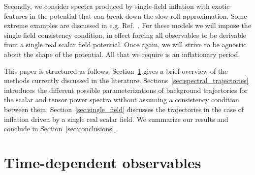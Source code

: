 \documentclass[a4paper,11pt]{article}
\begin{document}
Secondly, we consider spectra produced by single-field inflation with
exotic features in the potential that can break down the slow roll
approximation. Some extreme examples are discussed in
e.g. Ref.~\cite{Starobinsky1998}. For these models we will impose the
single field consistency condition, in effect forcing all observables
to be derivable from a single real scalar field potential. Once again,
we will strive to be agnostic about the shape of the potential. All
that we require is an inflationary period.

This paper is structured as follows. Section~\ref{sec:time_dependence}
gives a brief overview of the methods currently discussed in the
literature. Sections~\ref{sec:spectral_trajectories} introduces the
different possible parameterizations of background trajectories for
the scalar and tensor power spectra without assuming a consistency
condition between them. Section~\ref{sec:single_field} discusses the
trajectories in the case of inflation driven by a single real scalar
field. We summarize our results and conclude in
Section~\ref{sec:conclusions}.

\section{Time-dependent observables}\label{sec:time_dependence}
\end{document}
